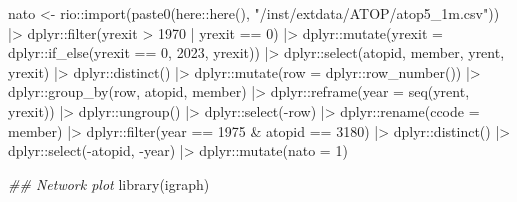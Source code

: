 \documentclass[
  12,
  letterpaper,
  DIV=11,
  numbers=noendperiod]{scrartcl}
\newenvironment{Shaded}{\begin{snugshade}}{\end{snugshade}}
\newcommand{\AttributeTok}[1]{\textcolor[rgb]{0.40,0.45,0.13}{#1}}
\newcommand{\DecValTok}[1]{\textcolor[rgb]{0.68,0.00,0.00}{#1}}
\newcommand{\DocumentationTok}[1]{\textcolor[rgb]{0.37,0.37,0.37}{\textit{#1}}}
\newcommand{\FunctionTok}[1]{\textcolor[rgb]{0.28,0.35,0.67}{#1}}
\newcommand{\NormalTok}[1]{\textcolor[rgb]{0.00,0.23,0.31}{#1}}
\newcommand{\OtherTok}[1]{\textcolor[rgb]{0.00,0.23,0.31}{#1}}
\newcommand{\SpecialCharTok}[1]{\textcolor[rgb]{0.37,0.37,0.37}{#1}}
\newcommand{\StringTok}[1]{\textcolor[rgb]{0.13,0.47,0.30}{#1}}
\begin{document}
\begin{Shaded}
\begin{Highlighting}[numbers=left,,]
\NormalTok{nato }\OtherTok{\textless{}{-}}\NormalTok{ rio}\SpecialCharTok{::}\FunctionTok{import}\NormalTok{(}\FunctionTok{paste0}\NormalTok{(here}\SpecialCharTok{::}\FunctionTok{here}\NormalTok{(), }\StringTok{"/inst/extdata/ATOP/atop5\_1m.csv"}\NormalTok{)) }\SpecialCharTok{|\textgreater{}}
\NormalTok{  dplyr}\SpecialCharTok{::}\FunctionTok{filter}\NormalTok{(yrexit }\SpecialCharTok{\textgreater{}} \DecValTok{1970} \SpecialCharTok{|}
\NormalTok{                  yrexit }\SpecialCharTok{==} \DecValTok{0}\NormalTok{) }\SpecialCharTok{|\textgreater{}}
\NormalTok{  dplyr}\SpecialCharTok{::}\FunctionTok{mutate}\NormalTok{(}\AttributeTok{yrexit =}\NormalTok{ dplyr}\SpecialCharTok{::}\FunctionTok{if\_else}\NormalTok{(yrexit }\SpecialCharTok{==} \DecValTok{0}\NormalTok{,}
                                        \DecValTok{2023}\NormalTok{,}
\NormalTok{                                        yrexit)) }\SpecialCharTok{|\textgreater{}}
\NormalTok{  dplyr}\SpecialCharTok{::}\FunctionTok{select}\NormalTok{(atopid, member, yrent, yrexit) }\SpecialCharTok{|\textgreater{}}
\NormalTok{  dplyr}\SpecialCharTok{::}\FunctionTok{distinct}\NormalTok{() }\SpecialCharTok{|\textgreater{}}
\NormalTok{  dplyr}\SpecialCharTok{::}\FunctionTok{mutate}\NormalTok{(}\AttributeTok{row =}\NormalTok{ dplyr}\SpecialCharTok{::}\FunctionTok{row\_number}\NormalTok{()) }\SpecialCharTok{|\textgreater{}}
\NormalTok{  dplyr}\SpecialCharTok{::}\FunctionTok{group\_by}\NormalTok{(row, atopid, member) }\SpecialCharTok{|\textgreater{}}
\NormalTok{  dplyr}\SpecialCharTok{::}\FunctionTok{reframe}\NormalTok{(}\AttributeTok{year =} \FunctionTok{seq}\NormalTok{(yrent, yrexit)) }\SpecialCharTok{|\textgreater{}}
\NormalTok{  dplyr}\SpecialCharTok{::}\FunctionTok{ungroup}\NormalTok{() }\SpecialCharTok{|\textgreater{}}
\NormalTok{  dplyr}\SpecialCharTok{::}\FunctionTok{select}\NormalTok{(}\SpecialCharTok{{-}}\NormalTok{row) }\SpecialCharTok{|\textgreater{}}
\NormalTok{  dplyr}\SpecialCharTok{::}\FunctionTok{rename}\NormalTok{(}\AttributeTok{ccode =} \StringTok{\textquotesingle{}member\textquotesingle{}}\NormalTok{) }\SpecialCharTok{|\textgreater{}}
\NormalTok{  dplyr}\SpecialCharTok{::}\FunctionTok{filter}\NormalTok{(year }\SpecialCharTok{==} \DecValTok{1975} \SpecialCharTok{\&}\NormalTok{ atopid }\SpecialCharTok{==} \DecValTok{3180}\NormalTok{) }\SpecialCharTok{|\textgreater{}}
\NormalTok{  dplyr}\SpecialCharTok{::}\FunctionTok{distinct}\NormalTok{() }\SpecialCharTok{|\textgreater{}}
\NormalTok{  dplyr}\SpecialCharTok{::}\FunctionTok{select}\NormalTok{(}\SpecialCharTok{{-}}\NormalTok{atopid, }\SpecialCharTok{{-}}\NormalTok{year) }\SpecialCharTok{|\textgreater{}}
\NormalTok{  dplyr}\SpecialCharTok{::}\FunctionTok{mutate}\NormalTok{(}\AttributeTok{nato =} \DecValTok{1}\NormalTok{)}

\DocumentationTok{\#\# Network plot}
\FunctionTok{library}\NormalTok{(igraph)}
\end{Highlighting}
\end{Shaded}
\end{document}
